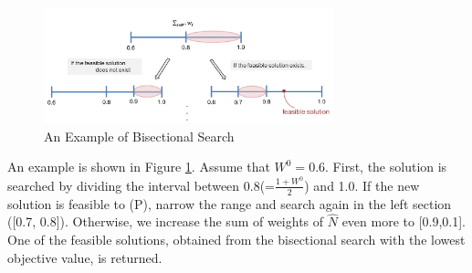 \documentclass[11pt]{article}
\begin{document}
	\begin{figure}[h] 
		\begin{center}
			\includegraphics[width=0.75\textwidth]{bisection}
			\caption{An Example of Bisectional Search} \label{fig:bisection}
		\end{center}
	\end{figure}
	An example is shown in Figure \ref{fig:bisection}. Assume that $W^0 = 0.6$. First, the solution is searched by dividing the interval between 0.8(=$\frac{1+W^0}{2}$) and 1.0. If the new solution is feasible to (P), narrow the range and search again in the left section ([0.7, 0.8]). Otherwise, we increase the sum of weights of $\hat{N}$ even more to [0.9,0.1]. One of the feasible solutions, obtained from the bisectional search with the lowest objective value, is returned. 
	
	
	
\end{document}
